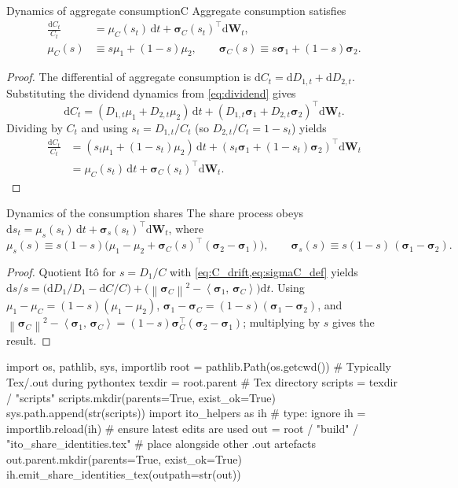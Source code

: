 ﻿\documentclass[11pt,letterpaper,oneside]{article}
\numberwithin{equation}{section}
\newcommand{\1}{\mathbf{1}}
\newcommand{\diff}{\mathrm{d}}
\newcommand{\norm}[1]{\left\lVert #1\right\rVert}
\newcommand{\ip}[2]{\left\langle #1,\,#2\right\rangle}
\begin{document}
\begin{lemma}{Dynamics of aggregate consumption}{C}
Aggregate consumption satisfies
\begin{align}
  \frac{\diff C_t}{C_t}
  &= \mu_C(s_t)\,\diff t + \bm{\sigma}_C(s_t)^{\top}\diff \bm{W}_t,
  \label{eq:C_drift}\\
  \mu_C(s) &\equiv s\mu_1+(1-s)\mu_2,
  \qquad
  \bm{\sigma}_C(s) \equiv s\bm{\sigma}_1+(1-s)\bm{\sigma}_2.
  \label{eq:sigmaC_def}
\end{align}
\end{lemma}
\begin{proof}
The differential of aggregate consumption is \mbox{$\diff C_t = \diff D_{1,t}+\diff D_{2,t}$}. Substituting the dividend dynamics from \cref{eq:dividend} gives
\[
  \diff C_t = (D_{1,t}\mu_1+D_{2,t}\mu_2)\,\diff t + (D_{1,t}\bm{\sigma}_1+D_{2,t}\bm{\sigma}_2)^{\top}\diff\bm{W}_t.
\]
Dividing by $C_t$ and using $s_t=D_{1,t}/C_t$ (so $D_{2,t}/C_t=1-s_t$) yields
\begin{align*}
  \frac{\diff C_t}{C_t}
  &= (s_t\mu_1+(1-s_t)\mu_2)\,\diff t + (s_t\bm{\sigma}_1+(1-s_t)\bm{\sigma}_2)^{\top}\diff\bm{W}_t \\
  &= \mu_C(s_t)\,\diff t + \bm{\sigma}_C(s_t)^{\top}\diff\bm{W}_t.
\end{align*}
\end{proof}
\begin{lemma}{Dynamics of the consumption share}{s}
The share process obeys $\diff s_t=\mu_s(s_t)\,\diff t+\bm{\sigma}_s(s_t)^{\top}\diff\bm{W}_t$, where
\[
  \mu_s(s)\equiv s(1-s)\Big(\mu_1-\mu_2+\bm{\sigma}_C(s)^{\top}(\bm{\sigma}_2-\bm{\sigma}_1)\Big),
  \qquad
  \bm{\sigma}_s(s)\equiv s(1-s)\,(\bm{\sigma}_1-\bm{\sigma}_2).
\]
\end{lemma}
\begin{proof}
Quotient It\^o for $s=D_1/C$ with \cref{eq:C_drift,eq:sigmaC_def} yields $\diff s/s=\big(\diff D_1/D_1-\diff C/C\big)+\big(\norm{\bm{\sigma}_C}^2-\ip{\bm{\sigma}_1}{\bm{\sigma}_C}\big)\diff t$.
Using $\mu_1-\mu_C=(1-s)(\mu_1-\mu_2)$, $\bm{\sigma}_1-\bm{\sigma}_C=(1-s)(\bm{\sigma}_1-\bm{\sigma}_2)$, and
$\norm{\bm{\sigma}_C}^2-\ip{\bm{\sigma}_1}{\bm{\sigma}_C}=(1-s)\bm{\sigma}_C^{\top}(\bm{\sigma}_2-\bm{\sigma}_1)$; multiplying by $s$ gives the result.
\end{proof}

\begin{pycode}
import os, pathlib, sys, importlib
root = pathlib.Path(os.getcwd())           # Typically Tex/.out during pythontex
texdir = root.parent                       # Tex directory
scripts = texdir / "scripts"
scripts.mkdir(parents=True, exist_ok=True)
sys.path.append(str(scripts))
import ito_helpers as ih  # type: ignore
ih = importlib.reload(ih)  # ensure latest edits are used
out = root / "build" / "ito_share_identities.tex"  # place alongside other .out artefacts
out.parent.mkdir(parents=True, exist_ok=True)
ih.emit_share_identities_tex(outpath=str(out))
\end{pycode}
\end{document}
